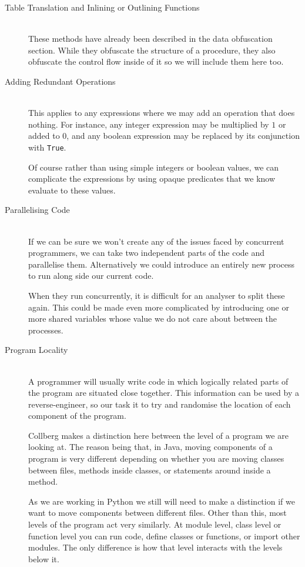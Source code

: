 \documentclass{report}
\begin{document}
\begin{description}
\item[Table Translation and Inlining or Outlining Functions] \hfill \\
These methods have already been described in the data obfuscation section. While they obfuscate the structure of a procedure,
they also obfuscate the control flow inside of it so we will include them here too.

\item[Adding Redundant Operations] \hfill \\
This applies to any expressions where we may add an operation that does nothing. For instance, any integer expression may
be multiplied by $1$ or added to $0$, and any boolean expression may be replaced by its conjunction with \texttt{True}.

Of course rather than using simple integers or boolean values, we can complicate the expressions by using opaque predicates
that we know evaluate to these values.

\item[Parallelising Code] \hfill \\
If we can be sure we won't create any of the issues faced by concurrent programmers, we can take two independent parts of
the code and parallelise them. Alternatively we could introduce an entirely new process to run along side our current code.

When they run concurrently, it is difficult for an analyser to split these again. This could be made even more complicated
by introducing one or more shared variables whose value we do not care about between the processes.

\item[Program Locality] \hfill \\
A programmer will usually write code in which logically related parts of the program are situated close together. This information
can be used by a reverse-engineer, so our task it to try and randomise the location of each component of the program.

Collberg makes a distinction here between the level of a program we are looking at. The reason being that, in Java, moving components of
a program is very different depending on whether you are moving classes between files, methods inside classes, or statements around
inside a method.

As we are working in Python we still will need to make a distinction if we want to move components between different files. Other
than this, most levels of the program act very similarly. At module level, class level or function level you can run code, define
classes or functions, or import other modules. The only difference is how that level interacts with the levels below it.

\end{description}
\end{document}
